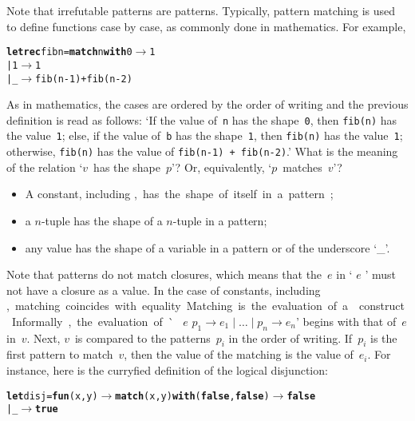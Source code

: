 \noindent Note that irrefutable patterns are patterns. Typically,
pattern matching is used to define functions case by case, as commonly
done in mathematics. For example,
\begin{alltt}
\textbf{let rec} fib n = \textbf{match} n \textbf{with} 0 \(\rightarrow\) 1
                           | 1 \(\rightarrow\) 1
                           | \_ \(\rightarrow\) fib(n-1) + fib(n-2)
\end{alltt}
As in mathematics, the cases are ordered by the order of writing and
the previous definition is read as follows: `If the value
of~\texttt{n} has the shape~\texttt{0}, then \texttt{fib(n)} has the
value~\texttt{1}; else, if the value of~\texttt{b} has the
shape~\texttt{1}, then \texttt{fib(n)} has the value~\texttt{1};
otherwise, \texttt{fib(n)} has the value of \texttt{fib(n-1) +
fib(n-2)}.' What is the meaning of the relation `\(v\)~has the
shape~\(p\)'?  Or, equivalently, `\(p\)~matches~\(v\)'?
\begin{itemize}

  \item A constant, including \unit, has the shape of itself in a
    pattern;

  \item a \(n\)-tuple has the shape of a \(n\)-tuple in a pattern;

  \item any value has the shape of a variable in a pattern or
    of the underscore `{\Large \_}'.

\end{itemize}
Note that patterns do not match closures, which means that the~\(e\)
in `\Xmatch{} $e$ \Xwith{}' must not have a closure as a value. In the
case of constants, including \unit, matching coincides with equality.

Matching is the evaluation of a \Xmatch construct. Informally, the
evaluation of `\Xmatch{} $e$ \Xwith{} $p_1 \rightarrow e_1 \mid
\ldots \mid p_n \rightarrow e_n$' begins with that of~$e$
in~$v$. Next, \(v\)~is compared to the patterns~\(p_i\) in the order
of writing. If~\(p_i\) is the first pattern to match~\(v\), then the
value of the matching is the value of~\(e_i\). For instance, here is
the curryfied definition of the logical disjunction:
\begin{alltt}
\textbf{let} disj = \textbf{fun} (x,y) \(\rightarrow\) \textbf{match} (x,y) \textbf{with} (\textbf{false}, \textbf{false}) \(\rightarrow\) \textbf{false}
                                       | \_ \(\rightarrow\) \textbf{true}
\end{alltt}

